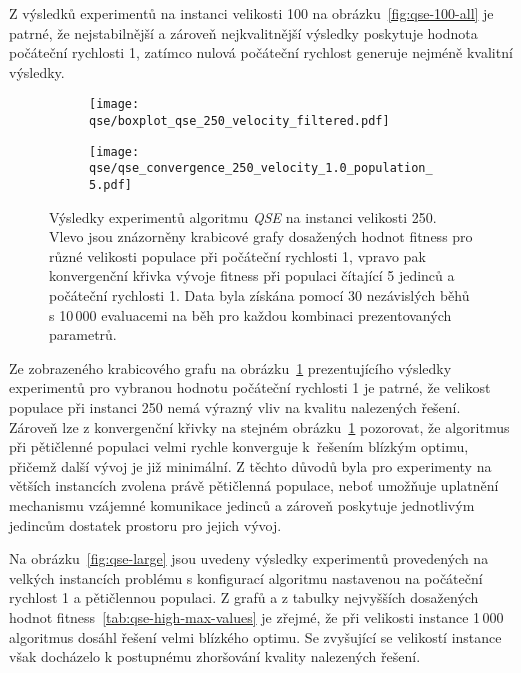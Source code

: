 Z výsledků experimentů na instanci velikosti 100 na obrázku~\ref{fig:qse-100-all} je patrné, že nejstabilnější a zároveň nejkvalitnější výsledky poskytuje hodnota počáteční rychlosti 1, zatímco nulová počáteční rychlost generuje nejméně kvalitní výsledky. 

\begin{figure}[ht!]
    \centering
    \begin{subfigure}[b]{0.45\textwidth}
      \texttt{[image: qse/boxplot\_qse\_250\_velocity\_filtered.pdf]}
    \end{subfigure}
    \hfill
    \begin{subfigure}[b]{0.48\textwidth}
        \texttt{[image: qse/qse\_convergence\_250\_velocity\_1.0\_population\_5.pdf]}
    \end{subfigure}
    \caption{Výsledky experimentů algoritmu \emph{QSE} na instanci velikosti 250. Vlevo jsou znázorněny krabicové grafy dosažených hodnot fitness pro různé velikosti populace při počáteční rychlosti 1, vpravo pak konvergenční křivka vývoje fitness při populaci čítající 5 jedinců a počáteční rychlosti 1. Data byla získána pomocí 30 nezávislých běhů s 10\,000 evaluacemi na běh pro každou kombinaci prezentovaných parametrů.}
    \label{fig:qse-250-mix}
\end{figure}

Ze zobrazeného krabicového grafu na obrázku~\ref{fig:qse-250-mix} prezentujícího výsledky experimentů pro vybranou hodnotu počáteční rychlosti 1 je patrné, že velikost populace při instanci 250 nemá výrazný vliv na kvalitu nalezených řešení.
Zároveň lze z konvergenční křivky na stejném obrázku~\ref{fig:qse-250-mix} pozorovat, že algoritmus při pětičlenné populaci velmi rychle konverguje k~řešením blízkým optimu, přičemž další vývoj je již minimální. 
Z těchto důvodů byla pro experimenty na větších instancích zvolena právě pětičlenná populace, neboť umožňuje uplatnění mechanismu vzájemné komunikace jedinců a zároveň poskytuje jednotlivým jedincům dostatek prostoru pro jejich vývoj. 

Na obrázku~\ref{fig:qse-large} jsou uvedeny výsledky experimentů provedených na velkých instancích problému s konfigurací algoritmu nastavenou na počáteční rychlost 1 a pětičlennou populaci.
Z grafů a z tabulky nejvyšších dosažených hodnot fitness~\ref{tab:qse-high-max-values} je zřejmé, že při velikosti instance 1\,000 algoritmus dosáhl řešení velmi blízkého optimu. Se zvyšující se velikostí instance však docházelo k postupnému zhoršování kvality nalezených řešení.


